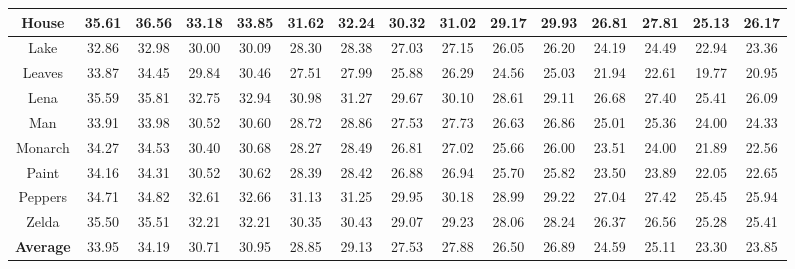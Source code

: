 \begin{table}[t!]
\begin{adjustwidth}{-1.5cm}{}
\begin{tabular}{|c||c|c||c|c||c|c||c|c||c|c||c|c||c|c|}
\\
\hline
House&35.61&36.56      &33.18&33.85   & 31.62& 32.24  &30.32 &31.02  & 29.17 &29.93   &26.81 & 27.81  & 25.13&26.17  
\\
\hline
Lake&32.86&32.98     &30.00&30.09   &28.30 &28.38   &27.03 & 27.15  & 26.05 &26.20   &24.19 &24.49    &22.94 &23.36
\\
\hline
Leaves&33.87& 34.45     &29.84&30.46    &27.51 &27.99  & 25.88 & 26.29  &24.56 &25.03   &21.94& 22.61   &19.77&20.95
\\
\hline  
Lena&35.59&35.81     &32.75&32.94  &30.98 &31.27  &29.67 &30.10   &28.61 & 29.11   &26.68 &  27.40      &25.41 &26.09
\\
\hline
Man&33.91&33.98      &30.52&30.60  & 28.72 & 28.86   &27.53 & 27.73   &26.63 &  26.86  &25.01& 25.36     &24.00 &24.33 
\\
\hline
Monarch&34.27&34.53    &30.40&30.68   & 28.27&28.49    &26.81 &27.02  &25.66 & 26.00  &23.51 & 24.00       &21.89 &22.56 
\\
\hline
Paint &34.16&34.31    &30.52&30.62   &28.39 &28.42   & 26.88 & 26.94  &25.70 & 25.82 &23.50& 23.89  &22.05&22.65
\\
\hline
Peppers&34.71&34.82    & 32.61&32.66   &31.13 & 31.25 &29.95  & 30.18  &28.99 & 29.22  &27.04&  27.42    &25.45 &25.94
\\  
\hline
Zelda&35.50&35.51    &32.21&32.21  & 30.35 &30.43   &29.07 &29.23   & 28.06& 28.24  &26.37& 26.56     &25.28&25.41
\\
\hline
\textbf{Average}&33.95&34.19    &30.71&30.95   & 28.85 & 29.13   &27.53&27.88   & 26.50 & 26.89  &24.59 &25.11  &23.30&23.85       
\\
\hline
\end{tabular}
\end{adjustwidth}
\end{table}

